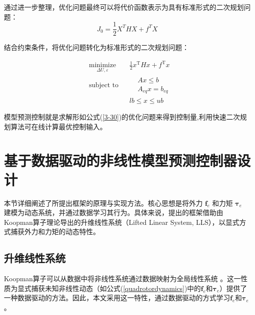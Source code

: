 \documentclass[lang=chs, degree=master, blindreview=false, winfonts=true]{yanputhesis}
\begin{document}
通过进一步整理，优化问题最终可以将代价函数表示为具有标准形式的二次规划问题：
\begin{equation}
	J_0 = \frac{1}{2} X^T H X + f^T X
\end{equation}

结合约束条件，将优化问题转化为标准形式的二次规划问题：

\begin{equation}
\begin{aligned}
	&\operatorname*{minimize}_{\Delta U,\varepsilon}&& \frac{1}{2}x^{\mathrm{T}}Hx+f^{\mathrm{T}}x  \\
	&\text{subject to}&& \begin{aligned}&Ax\leq b\\
		&A_{eq}x=b_{eq}\end{aligned}  \\
	&&&lb\leq x\leq ub\
\end{aligned}
\label{3-30}
\end{equation}

模型预测控制就是求解形如公式(\ref{3-30})的优化问题来得到控制量,利用快速二次规划算法可在线计算最优控制输入。




\section{基于数据驱动的非线性模型预测控制器设计}
本节详细阐述了所提出框架的原理与实现方法。核心思想是将外力 $\bm{f}_e$ 和力矩 $\bm{\tau}_e$ 建模为动态系统，并通过数据学习其行为。具体来说，提出的框架借助由Koopman算子理论导出的升维线性系统（Lifted Linear System, LLS），以显式方式捕获外力和力矩的动态特性。

\subsection{升维线性系统}
Koopman算子可以从数据中将非线性系统通过数据映射为全局线性系统 \cite{Mamakoukas2023}。这一性质为显式捕获未知非线性动态（如公式(\ref{quadrotordynamics})中的$\bm f_e$和$\bm \tau_e$）提供了一种数据驱动的方法。因此，本文采用这一特性，通过数据驱动的方式学习$\bm f_e$和$\bm \tau_e$。
\end{document}
